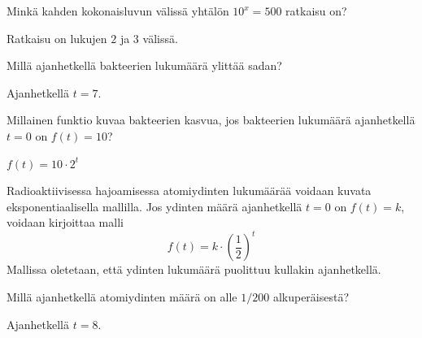 \begin{tehtava}
Minkä kahden kokonaisluvun välissä yhtälön
$10^x = 500$ ratkaisu on?
\begin{vastaus}
Ratkaisu on lukujen $2$ ja $3$ välissä.
\end{vastaus}
\end{tehtava}


\begin{tehtava}
Millä ajanhetkellä bakteerien lukumäärä ylittää sadan?
\begin{vastaus}
Ajanhetkellä $t = 7$.
\end{vastaus}
\end{tehtava}

\begin{tehtava}
Millainen funktio kuvaa bakteerien kasvua, jos bakteerien lukumäärä
ajanhetkellä $t = 0$ on $f(t) = 10$?
\begin{vastaus}
$f(t) = 10 \cdot 2^t$
\end{vastaus}
\end{tehtava}

\begin{esimerkki}
Radioaktiivisessa hajoamisessa atomiydinten lukumäärää voidaan
kuvata eksponentiaalisella mallilla. Jos ydinten määrä ajanhetkellä
$t = 0$ on $f(t) = k$, voidaan kirjoittaa malli
\[
f(t) = k \cdot \left( \frac{1}{2} \right)^t
\]
Mallissa oletetaan, että ydinten lukumäärä puolittuu kullakin ajanhetkellä.
\end{esimerkki}

\begin{tehtava}
Millä ajanhetkellä atomiydinten määrä on alle $1/200$ alkuperäisestä?
\begin{vastaus}
Ajanhetkellä $t = 8$.
\end{vastaus}
\end{tehtava}